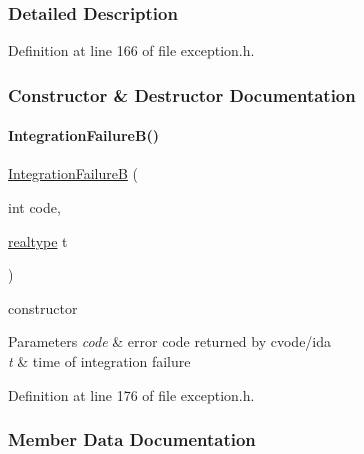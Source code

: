 \subsubsection{Detailed Description}


Definition at line 166 of file exception.\+h.



\subsubsection{Constructor \& Destructor Documentation}
\mbox{\label{classamici_1_1_integration_failure_b_ad87179c92d6479d56fb3977efa1dc481}} 
\paragraph{\texorpdfstring{Integration\+Failure\+B()}{IntegrationFailureB()}}
{\footnotesize\ttfamily \mbox{\hyperlink{classamici_1_1_integration_failure_b}{Integration\+FailureB}} (\begin{DoxyParamCaption}\item[{int}]{code,  }\item[{\mbox{\hyperlink{namespaceamici_a1bdce28051d6a53868f7ccbf5f2c14a3}{realtype}}}]{t }\end{DoxyParamCaption})}

constructor 
\begin{DoxyParams}{Parameters}
{\em code} & error code returned by cvode/ida \\
\hline
{\em t} & time of integration failure \\
\hline
\end{DoxyParams}


Definition at line 176 of file exception.\+h.



\subsubsection{Member Data Documentation}
\mbox{\label{classamici_1_1_integration_failure_b_a7d16b1c68c87cec009d972e79abfba78}} 
